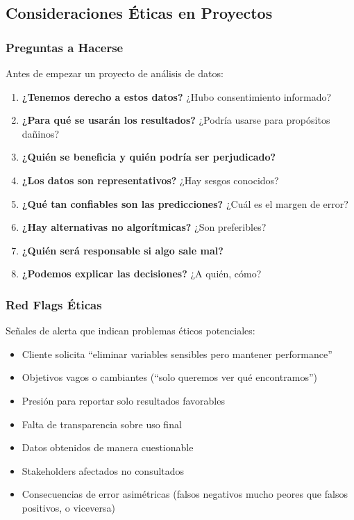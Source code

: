 \documentclass[11pt,a4paper]{article}
\begin{document}
\subsection{Consideraciones Éticas en Proyectos}

\subsubsection{Preguntas a Hacerse}

Antes de empezar un proyecto de análisis de datos:

\begin{enumerate}
\item \textbf{¿Tenemos derecho a estos datos?} ¿Hubo consentimiento informado?
\item \textbf{¿Para qué se usarán los resultados?} ¿Podría usarse para propósitos dañinos?
\item \textbf{¿Quién se beneficia y quién podría ser perjudicado?}
\item \textbf{¿Los datos son representativos?} ¿Hay sesgos conocidos?
\item \textbf{¿Qué tan confiables son las predicciones?} ¿Cuál es el margen de error?
\item \textbf{¿Hay alternativas no algorítmicas?} ¿Son preferibles?
\item \textbf{¿Quién será responsable si algo sale mal?}
\item \textbf{¿Podemos explicar las decisiones?} ¿A quién, cómo?
\end{enumerate}

\subsubsection{Red Flags Éticas}

Señales de alerta que indican problemas éticos potenciales:

\begin{itemize}
\item Cliente solicita ``eliminar variables sensibles pero mantener performance''
\item Objetivos vagos o cambiantes (``solo queremos ver qué encontramos'')
\item Presión para reportar solo resultados favorables
\item Falta de transparencia sobre uso final
\item Datos obtenidos de manera cuestionable
\item Stakeholders afectados no consultados
\item Consecuencias de error asimétricas (falsos negativos mucho peores que falsos positivos, o viceversa)
\end{itemize}
\end{document}

